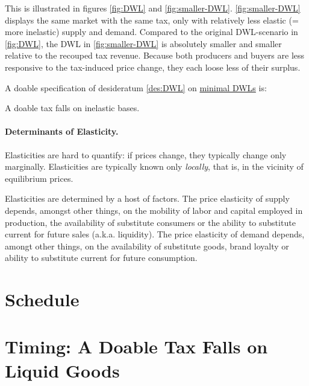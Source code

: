 
This is illustrated in figures \ref{fig:DWL} and \ref{fig:smaller-DWL}. \autoref{fig:smaller-DWL} displays the same market with the same tax, only with relatively less elastic (= more inelastic) supply and demand. Compared to the original DWL-scenario in \autoref{fig:DWL}, the DWL in \autoref{fig:smaller-DWL} is absolutely smaller and smaller relative to the recouped tax revenue. Because both producers and buyers are less responsive to the tax-induced price change, they each loose less of their surplus.

A doable specification of desideratum \ref{des:DWL} on \href{des:DWL}{minimal DWLs} is:

\begin{desideratum}
	A doable tax falls on inelastic bases.
	\label{des:tax-inelastic}
\end{desideratum}

\paragraph{Determinants of Elasticity.} Elasticities are hard to quantify: if prices change, they typically change only marginally. Elasticities are typically known only \emph{locally}, that is, in the vicinity of equilibrium prices.

Elasticities are determined by a host of factors. The price elasticity of supply depends, amongst other things, on the mobility of labor and capital employed in production, the availability of substitute consumers or the ability to substitute current for future sales (a.k.a. liquidity). The price elasticity of demand depends, amongt other things, on the availability of substitute goods, brand loyalty or ability to substitute current for future consumption.

\section[Schedule]{Schedule} \label{sec:tax-schedule}


\section[Timing]{Timing: A Doable Tax Falls on Liquid Goods} \label{sec:tax-timing} %

